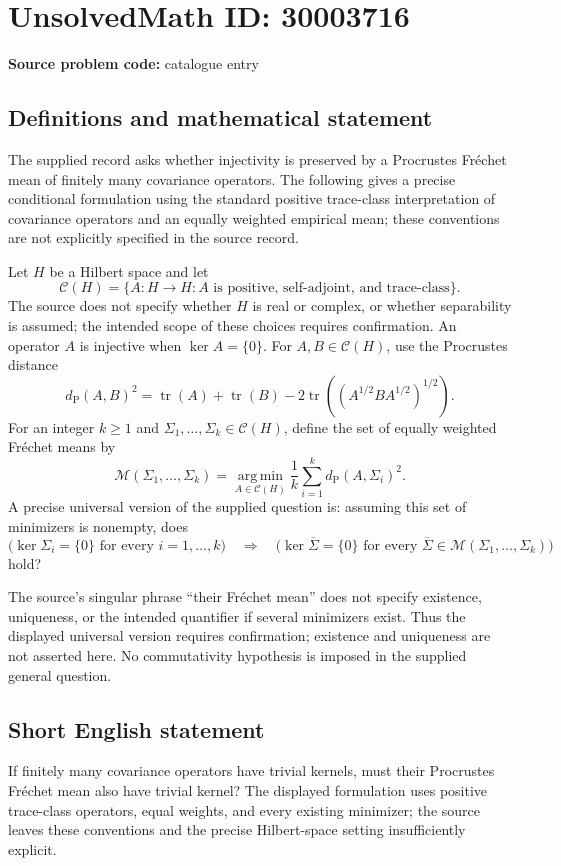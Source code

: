 \documentclass[11pt]{article}
\begin{document}
\section*{UnsolvedMath ID: 30003716}
\textbf{Source problem code:} catalogue entry
\subsection{Definitions and mathematical statement}
The supplied record asks whether injectivity is preserved by a Procrustes Fr\'echet mean of finitely many covariance operators. The following gives a precise conditional formulation using the standard positive trace-class interpretation of covariance operators and an equally weighted empirical mean; these conventions are not explicitly specified in the source record.

Let \(H\) be a Hilbert space and let
\[
\mathcal C(H)=\{A:H\to H: A\text{ is positive, self-adjoint, and trace-class}\}.
\]
The source does not specify whether \(H\) is real or complex, or whether separability is assumed; the intended scope of these choices requires confirmation. An operator \(A\) is injective when \(\ker A=\{0\}\). For \(A,B\in\mathcal C(H)\), use the Procrustes distance
\[
d_{\mathrm P}(A,B)^2
=\operatorname{tr}(A)+\operatorname{tr}(B)
-2\operatorname{tr}\!\left((A^{1/2}BA^{1/2})^{1/2}\right).
\]
For an integer \(k\geq 1\) and \(\Sigma_1,\ldots,\Sigma_k\in\mathcal C(H)\), define the set of equally weighted Fr\'echet means by
\[
\mathcal M(\Sigma_1,\ldots,\Sigma_k)
=\operatorname*{arg\,min}_{A\in\mathcal C(H)}
\frac1k\sum_{i=1}^{k}d_{\mathrm P}(A,\Sigma_i)^2.
\]
A precise universal version of the supplied question is: assuming this set of minimizers is nonempty, does
\[
\bigl(\ker\Sigma_i=\{0\}\text{ for every }i=1,\ldots,k\bigr)
\quad\Longrightarrow\quad
\bigl(\ker\overline\Sigma=\{0\}\text{ for every }
\overline\Sigma\in\mathcal M(\Sigma_1,\ldots,\Sigma_k)\bigr)
\]
hold?

The source's singular phrase ``their Fr\'echet mean'' does not specify existence, uniqueness, or the intended quantifier if several minimizers exist. Thus the displayed universal version requires confirmation; existence and uniqueness are not asserted here. No commutativity hypothesis is imposed in the supplied general question.
\subsection{Short English statement}
If finitely many covariance operators have trivial kernels, must their Procrustes Fr\'echet mean also have trivial kernel? The displayed formulation uses positive trace-class operators, equal weights, and every existing minimizer; the source leaves these conventions and the precise Hilbert-space setting insufficiently explicit.
\end{document}
